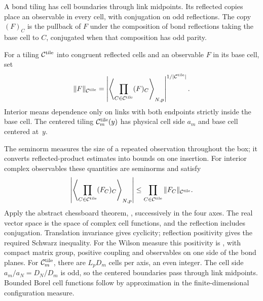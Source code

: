 \begin{samepage}
A bond tiling has cell boundaries through link midpoints. Its reflected copies place an observable in every cell, with conjugation on odd reflections. The copy $(F)_C$ is the pullback of $F$ under the composition of bond reflections taking the base cell to $C$, conjugated when that composition has odd parity.
\begin{definition}\label{def:D27}
For a tiling $\mathcal C^{\rm tile}$ into congruent reflected cells and an observable $F$ in its base cell, set
\begin{equation*}
\|F\|_{\mathcal C^{\rm tile}}=
\left|\left\langle\prod_{C\in\mathcal C^{\rm tile}}(F)_C\right\rangle_{N,p}\right|^{1/|\mathcal C^{\rm tile}|}.
\end{equation*}
Interior means dependence only on links with both endpoints strictly inside the base cell. The centered tiling $\mathcal C^{\rm tile}_m(y)$ has physical cell side $a_m$ and base cell centered at~$y$.
\end{definition}
\end{samepage}
The seminorm measures the size of a repeated observation throughout the box; it converts reflected-product estimates into bounds on one insertion. For interior complex observables these quantities are seminorms and satisfy
\begin{equation}\label{eq:E-chess}
\left|\left\langle\prod_{C\in\mathcal C^{\rm tile}}(F_C)_C\right\rangle_{N,p}\right|
\le\prod_{C\in\mathcal C^{\rm tile}}\|F_C\|_{\mathcal C^{\rm tile}}.
\end{equation}
Apply the abstract chessboard theorem, \cite[Theorem~4.1]{FrohlichIsraelLiebSimon1978}, successively in the four axes. The real vector space is the space of complex cell functions, and the reflection includes conjugation. Translation invariance gives cyclicity; reflection positivity gives the required Schwarz inequality. For the Wilson measure this positivity is \cite[Theorem~2.1, pp.~14--15]{Seiler1982}, with compact matrix group, positive coupling and observables on one side of the bond planes. For $\mathcal C^{\rm tile}_m$, there are $L_pD_m$ cells per axis, an even integer. The cell side $a_m/a_N=D_N/D_m$ is odd, so the centered boundaries pass through link midpoints. Bounded Borel cell functions follow by approximation in the finite-dimensional configuration measure.

